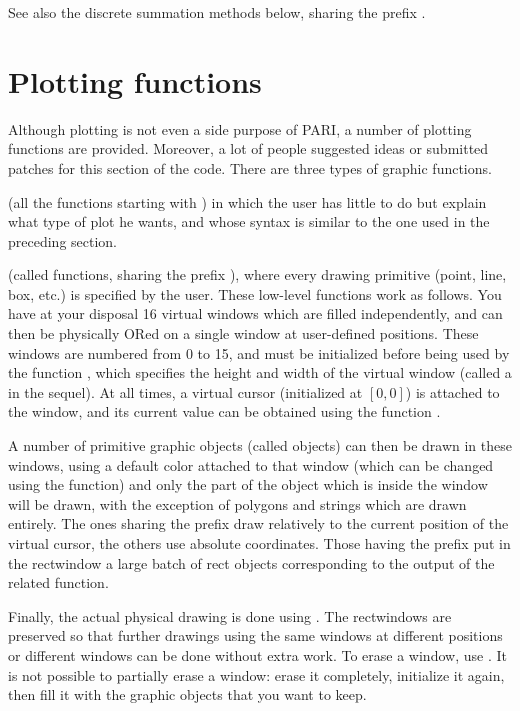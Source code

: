 See also the discrete summation methods below, sharing the prefix .


\section{Plotting functions}

  Although plotting is not even a side purpose of PARI, a number of plotting
functions are provided. Moreover, a lot of people suggested ideas or
submitted patches for this section of the code. There are three types of
graphic functions.

 (all the functions starting with
) in which the user has little to do but explain what type of plot
he wants, and whose syntax is similar to the one used in the preceding
section.

 (called  functions,
sharing the prefix ), where every drawing primitive (point, line,
box, etc.) is specified by the user. These low-level functions work as
follows. You have at your disposal 16 virtual windows which are filled
independently, and can then be physically ORed on a single window at
user-defined positions. These windows are numbered from 0 to 15, and must be
initialized before being used by the function , which specifies
the height and width of the virtual window (called a  in the
sequel). At all times, a virtual cursor (initialized at $[0,0]$) is attached
to the window, and its current value can be obtained using the function
.

A number of primitive graphic objects (called  objects) can then
be drawn in these windows, using a default color attached to that window
(which can be changed using the  function) and only the part
of the object which is inside the window will be drawn, with the exception of
polygons and strings which are drawn entirely. The ones sharing the prefix
 draw relatively to the current position of the virtual cursor,
the others use absolute coordinates. Those having the prefix 
put in the rectwindow a large batch of rect objects corresponding to the
output of the related  function.

   Finally, the actual physical drawing is done using . The
rectwindows are preserved so that further drawings using the same windows at
different positions or different windows can be done without extra work. To
erase a window, use . It is not possible to partially erase a
window: erase it completely, initialize it again, then fill it with the
graphic objects that you want to keep.

